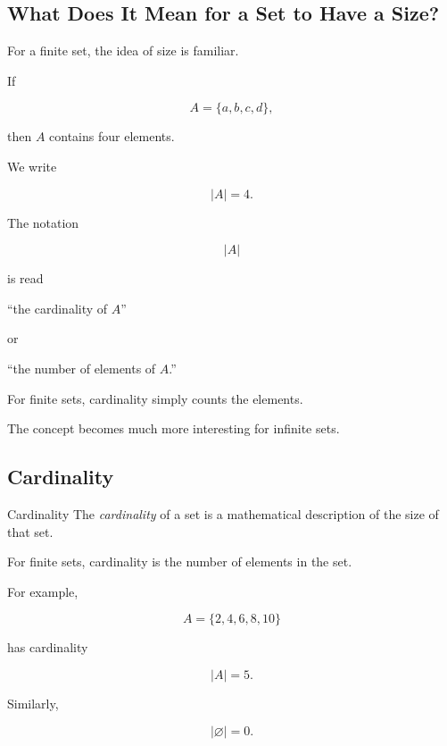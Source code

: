 \subsection{What Does It Mean for a Set to Have a Size?}
\label{subsec:meaning-cardinality}

For a finite set, the idea of size is familiar.

If

\[ A=\{a,b,c,d\}, \]

then \(A\) contains four elements.

We write

\[ |A|=4. \]

The notation

\[ |A| \]

is read

\begin{center}
``the cardinality of \(A\)''
\end{center}

or

\begin{center}
``the number of elements of \(A\).''
\end{center}

For finite sets, cardinality simply counts the elements.

The concept becomes much more interesting for infinite sets.

\subsection{Cardinality}
\label{subsec:cardinality-definition}

\begin{definitionbox}{Cardinality}
The \emph{cardinality} of a set is a mathematical description of the size of
that set.

For finite sets, cardinality is the number of elements in the set.
\end{definitionbox}

For example,

\[ A=\{2,4,6,8,10\} \]

has cardinality

\[ |A|=5. \]

Similarly,

\[ |\varnothing|=0. \]

